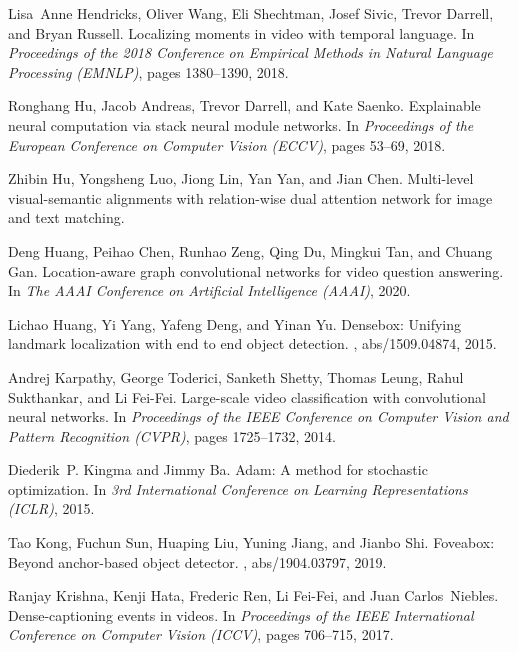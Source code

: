 \documentclass[10pt,twocolumn,letterpaper]{article}
\begin{document}
\begin{thebibliography}{10}
	Lisa~Anne Hendricks, Oliver Wang, Eli Shechtman, Josef Sivic, Trevor Darrell,
	and Bryan Russell.
	\newblock Localizing moments in video with temporal language.
	\newblock In {\em Proceedings of the 2018 Conference on Empirical Methods in
		Natural Language Processing (EMNLP)}, pages 1380--1390, 2018.
	
	Ronghang Hu, Jacob Andreas, Trevor Darrell, and Kate Saenko.
	\newblock Explainable neural computation via stack neural module networks.
	\newblock In {\em Proceedings of the European Conference on Computer Vision
		(ECCV)}, pages 53--69, 2018.
	
	Zhibin Hu, Yongsheng Luo, Jiong Lin, Yan Yan, and Jian Chen.
	\newblock Multi-level visual-semantic alignments with relation-wise dual
	attention network for image and text matching.
	
	Deng Huang, Peihao Chen, Runhao Zeng, Qing Du, Mingkui Tan, and Chuang Gan.
	\newblock Location-aware graph convolutional networks for video question
	answering.
	\newblock In {\em The AAAI Conference on Artificial Intelligence (AAAI)}, 2020.
	
	Lichao Huang, Yi Yang, Yafeng Deng, and Yinan Yu.
	\newblock Densebox: Unifying landmark localization with end to end object
	detection.
	, abs/1509.04874, 2015.
	
	Andrej Karpathy, George Toderici, Sanketh Shetty, Thomas Leung, Rahul
	Sukthankar, and Li Fei-Fei.
	\newblock Large-scale video classification with convolutional neural networks.
	\newblock In {\em Proceedings of the IEEE Conference on Computer Vision and
		Pattern Recognition (CVPR)}, pages 1725--1732, 2014.
	
	Diederik~P. Kingma and Jimmy Ba.
	\newblock Adam: {A} method for stochastic optimization.
	\newblock In {\em 3rd International Conference on Learning Representations
		(ICLR)}, 2015.
	
	Tao Kong, Fuchun Sun, Huaping Liu, Yuning Jiang, and Jianbo Shi.
	\newblock Foveabox: Beyond anchor-based object detector.
	, abs/1904.03797, 2019.
	
	Ranjay Krishna, Kenji Hata, Frederic Ren, Li Fei-Fei, and Juan Carlos~Niebles.
	\newblock Dense-captioning events in videos.
	\newblock In {\em Proceedings of the IEEE International Conference on Computer
		Vision (ICCV)}, pages 706--715, 2017.
	

\end{thebibliography}
\end{document}
